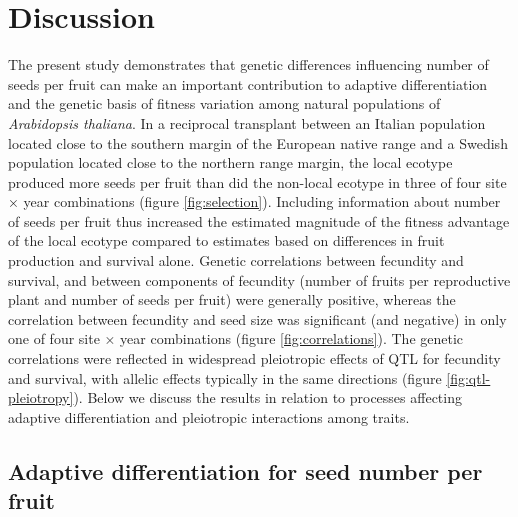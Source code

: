 \documentclass[12pt,]{article}
\begin{document}
\hypertarget{discussion}{%
\section{Discussion}\label{discussion}}

The present study demonstrates that genetic differences influencing number of seeds per fruit can make an important contribution to adaptive differentiation and the genetic basis of fitness variation among natural populations of \emph{Arabidopsis thaliana}. In a reciprocal transplant between an Italian population located close to the southern margin of the European native range and a Swedish population located close to the northern range margin, the local ecotype produced more seeds per fruit than did the non-local ecotype in three of four site × year combinations (figure \ref{fig:selection}). Including information about number of seeds per fruit thus increased the estimated magnitude of the fitness advantage of the local ecotype compared to estimates based on differences in fruit production and survival alone. Genetic correlations between fecundity and survival, and between components of fecundity (number of fruits per reproductive plant and number of seeds per fruit) were generally positive, whereas the correlation between fecundity and seed size was significant (and negative) in only one of four site × year combinations (figure \ref{fig:correlations}). The genetic correlations were reflected in widespread pleiotropic effects of QTL for fecundity and survival, with allelic effects typically in the same directions (figure \ref{fig:qtl-pleiotropy}). Below we discuss the results in relation to processes affecting adaptive differentiation and pleiotropic interactions among traits.

\hypertarget{adaptive-differentiation-for-seed-number-per-fruit}{%
\subsection{Adaptive differentiation for seed number per fruit}\label{adaptive-differentiation-for-seed-number-per-fruit}}
\end{document}
